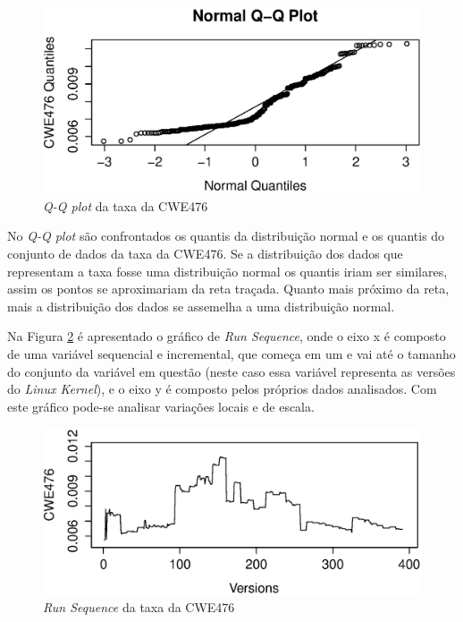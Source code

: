 \begin{figure}[h]
  \centering
  \includegraphics[width=1.0\textwidth]
      {figuras/cwe476-qq-plot.eps}
      \caption{\textit{Q-Q plot} da taxa da CWE476}
      \label{fig:cwe476-qq-plot}
\end{figure}

No \textit{Q-Q plot} são confrontados os quantis da distribuição normal e os
quantis do conjunto de dados da taxa da CWE476. Se a distribuição dos dados que
representam a taxa fosse uma distribuição normal os quantis iriam ser similares,
assim os pontos se aproximariam da reta traçada. Quanto mais próximo da reta,
mais a distribuição dos dados se assemelha a uma distribuição normal.

Na Figura \ref{fig:cwe476-run-sequence} é apresentado o gráfico de \textit{Run
Sequence}, onde o eixo x é composto de uma variável sequencial e incremental,
que começa em um e vai até o tamanho do conjunto da variável em questão (neste
caso essa variável representa as versões do \textit{Linux Kernel}), e o
eixo y é composto pelos próprios dados analisados. Com este gráfico pode-se
analisar variações locais e de escala.

\begin{figure}[h]
  \centering
  \includegraphics[width=1.0\textwidth]
      {figuras/cwe476-run-sequence.eps}
      \caption{\textit{Run Sequence} da taxa da CWE476}
      \label{fig:cwe476-run-sequence}
\end{figure}

